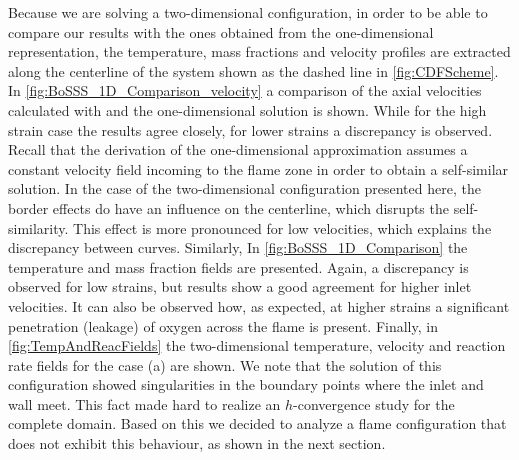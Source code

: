 Because we are solving a two-dimensional configuration, in order to be able to compare our results with the ones obtained from the one-dimensional representation, the temperature, mass fractions and velocity profiles are extracted along the centerline of the system shown as the dashed line in \cref{fig:CDFScheme}. In \cref{fig:BoSSS_1D_Comparison_velocity} a comparison of the axial velocities calculated with \BoSSS and the one-dimensional solution is shown. While for the high strain case the results agree closely, for lower strains a discrepancy is observed. Recall that the derivation of the one-dimensional approximation assumes a constant velocity field incoming to the flame zone in order to obtain a self-similar solution. In the case of the two-dimensional configuration presented here, the border effects do have an influence on the centerline, which disrupts the self-similarity. This effect is more pronounced for low velocities, which explains the discrepancy between curves. Similarly, In \cref{fig:BoSSS_1D_Comparison} the temperature and mass fraction fields are presented. Again, a discrepancy is observed for low strains, but results show a good agreement for higher inlet velocities. It can also be observed how, as expected, \cite{fernandez-tarrazoSimpleOnestepChemistry2006} at higher strains a significant penetration (leakage) of oxygen across the flame is present. Finally, in \cref{fig:TempAndReacFields} the two-dimensional temperature, velocity and reaction rate fields for the case (a) are shown. 
We note that the solution of this configuration showed singularities in the boundary points where the inlet and wall meet. This fact made hard to realize an $h$-convergence study for the complete domain. Based on this we decided to analyze a flame configuration that does not exhibit this behaviour, as shown in the next section.


